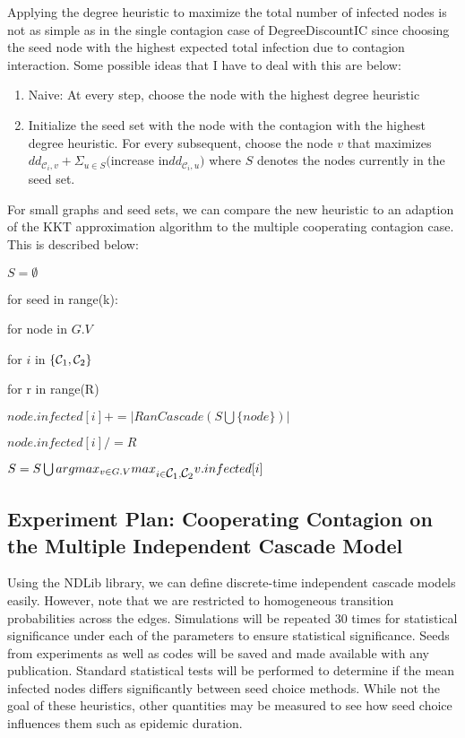 \documentclass[11pt]{article}
\begin{document}
Applying the degree heuristic to maximize the total number of infected nodes is not as simple as in the single contagion case of DegreeDiscountIC since choosing the seed node with the highest expected total infection due to contagion interaction. Some possible ideas that I have to deal with this are below:


\begin{enumerate}
    \item Naive: At every step, choose the node with the highest degree heuristic
    \item Initialize the seed set with the node with the contagion with the highest degree heuristic. For every subsequent, choose the node $v$ that maximizes $dd_{\mathcal{C}_i,v} + \Sigma_{u\in S}($increase in$ dd_{\mathcal{C}_i,u})$ where $S$ denotes the nodes currently in the seed set.
\end{enumerate}

For small graphs and seed sets, we can compare the new heuristic to an adaption of the KKT approximation algorithm to the multiple cooperating contagion case. This is described below:

$S = \emptyset$

for seed in range(k):

\indent\indent for node in $G.V$

\indent\indent\indent for $i$ in $\{\mbox{$\mathcal{C}_1$}{}, \mbox{$\mathcal{C}_2$}{}\}$

\indent\indent\indent\indent for r in range(R)

\indent\indent\indent\indent\indent $node.infected[i] += |RanCascade(S \bigcup \{node\})|$ 

\indent\indent\indent\indent $node.infected[i] /= R$

\indent\indent\indent $S = S \bigcup argmax_{v\in G.V}max_{i\in\mbox{$\mathcal{C}_1$}{}, \mbox{$\mathcal{C}_2$}{}} v.infected[i]$ 

\subsection{Experiment Plan: Cooperating Contagion on the Multiple Independent Cascade Model}
Using the NDLib library, we can define discrete-time independent cascade models easily. However, note that we are restricted to homogeneous transition probabilities across the edges. Simulations will be repeated 30 times for statistical significance under each of the parameters to ensure statistical significance. Seeds from experiments as well as codes will be saved and made available with any publication. Standard statistical tests will be performed to determine if the mean infected nodes differs significantly between seed choice methods. While not the goal of these heuristics, other quantities may be measured to see how seed choice influences them such as epidemic duration. 
\end{document}
